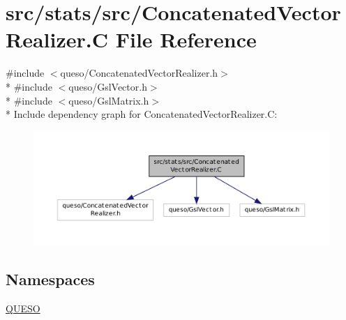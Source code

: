 \hypertarget{_concatenated_vector_realizer_8_c}{\section{src/stats/src/\-Concatenated\-Vector\-Realizer.C File Reference}
\label{_concatenated_vector_realizer_8_c}
}
{\ttfamily \#include $<$queso/\-Concatenated\-Vector\-Realizer.\-h$>$}\\*
{\ttfamily \#include $<$queso/\-Gsl\-Vector.\-h$>$}\\*
{\ttfamily \#include $<$queso/\-Gsl\-Matrix.\-h$>$}\\*
Include dependency graph for Concatenated\-Vector\-Realizer.\-C\-:
\nopagebreak
\begin{figure}[H]
\begin{center}
\leavevmode
\includegraphics[width=350pt]{_concatenated_vector_realizer_8_c__incl}
\end{center}
\end{figure}
\subsection*{Namespaces}
\begin{DoxyCompactItemize}
\item 
\hyperlink{namespace_q_u_e_s_o}{Q\-U\-E\-S\-O}
\end{DoxyCompactItemize}
